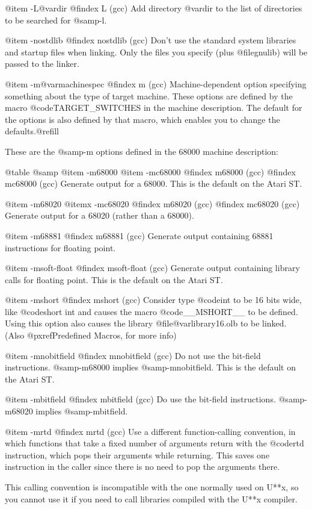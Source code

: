 {@item -L@var{dir}
@findex L (gcc)
Add directory @var{dir} to the list of directories to be searched
for @samp{-l}.

@item -nostdlib
@findex nostdlib (gcc)
Don't use the standard system libraries and startup files when
linking. Only the files you specify (plus @file{gnulib}) will be
passed to the linker.

@item -m@var{machinespec}
@findex m (gcc)
Machine-dependent option specifying something about the type of target
machine. These options are defined by the macro
@code{TARGET_SWITCHES} in the machine description. The default for
the options is also defined by that macro, which enables you to change
the defaults.@refill

These are the @samp{-m} options defined in the 68000 machine
description:

@table @samp
@item -m68000
@item -mc68000
@findex m68000 (gcc)
@findex mc68000 (gcc)
Generate output for a 68000. This is the default on the Atari ST.

@item -m68020
@itemx -mc68020
@findex m68020 (gcc)
@findex mc68020 (gcc)
Generate output for a 68020 (rather than a 68000).

@item -m68881
@findex m68881 (gcc)
Generate output containing 68881 instructions for floating point.

@item -msoft-float
@findex msoft-float (gcc)
Generate output containing library calls for floating point. This is the
default on the Atari ST.

@item -mshort
@findex mshort (gcc)
Consider type @code{int} to be 16 bits wide, like @code{short int} and
causes the macro @code{__MSHORT__} to be defined. Using this option
also causes the library @file{@var{library}16.olb} to be linked. (Also
@pxref{Predefined Macros}, for more info)

@item -mnobitfield
@findex mnobitfield (gcc)
Do not use the bit-field instructions.  @samp{-m68000} implies
@samp{-mnobitfield}. This is the default on the Atari ST.

@item -mbitfield
@findex mbitfield (gcc)
Do use the bit-field instructions.  @samp{-m68020} implies
@samp{-mbitfield}.

@item -mrtd
@findex mrtd (gcc)
Use a different function-calling convention, in which functions
that take a fixed number of arguments return with the @code{rtd}
instruction, which pops their arguments while returning. This
saves one instruction in the caller since there is no need to pop
the arguments there.

This calling convention is incompatible with the one normally
used on U**x, so you cannot use it if you need to call libraries
compiled with the U**x compiler.

}
